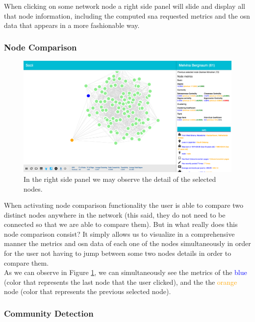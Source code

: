 When clicking on some network node a right side panel will slide and display all that node information, including the computed \gls{sna} requested metrics and the \gls{osn} data that appears in a more fashionable way.

\subsubsection{Node Comparison}

\begin{figure}[h!]
\begin{center}
  \hspace*{-0.8in}
  \includegraphics[width=1.2\textwidth]{img/socii/socii_7.png}
\end{center}
\caption{\label{img:socii_7} In the right side panel we may observe the detail of the selected nodes.}
\end{figure}

When activating node comparison functionality the user is able to compare two distinct nodes anywhere in the network (this said, they do not need to be connected so that we are able to compare them). But in what really does this node comparison consist? It simply allows us to visualize in a comprehensive manner the metrics and \gls{osn} data of each one of the nodes simultaneously in order for the user not having to jump between some two nodes details in order to compare them.\\
\indent As we can observe in Figure \ref{img:socii_7}, we can simultaneously see the metrics of the \textcolor{blue}{blue} (color that represents the last node that the user clicked), and the the \textcolor{orange}{orange} node (color that represents the previous selected node).

\subsubsection{Community Detection}

